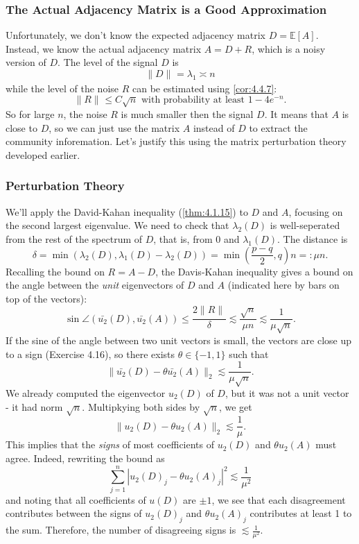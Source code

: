 \subsubsection{The Actual Adjacency Matrix is a Good Approximation}
Unfortunately, we don't know the expected adjacency matrix $D = \mathbb{E}\left[ A \right]$. Instead, we know 
the actual adjacency matrix $A = D + R$, which is a noisy version of $D$. The level of the signal $D$ is 
\[ \lVert D \rVert_{} = \lambda_1 \asymp n \]
while the level of the noise $R$ can be estimated using \cref{cor:4.4.7}:
\[ \lVert R \rVert_{} \leq C \sqrt{n} \text{ with probability at least } 1 - 4e^{-n}. \]
So for large $n$, the noise $R$ is much smaller then the signal $D$. It means that $A$ is close to $D$, so we 
can just use the matrix $A$ instead of $D$ to extract the community inforemation. Let's justify this using the 
matrix perturbation theory developed earlier.


\subsubsection{Perturbation Theory}
We'll apply the David-Kahan inequality (\cref{thm:4.1.15}) to $D$ and $A$, focusing on the second largest 
eigenvalue. We need to check that $\lambda_2(D)$ is well-seperated from the rest of the spectrum of $D$, that 
is, from 0 and $\lambda_1(D)$. The distance is 
\[ \delta = \min_{}(\lambda_2(D), \lambda_1(D) - \lambda_2(D)) = \min_{}\left( \frac{p - q}{2}, q \right)n 
=: \mu n. \]
Recalling the bound on $R = A - D$, the Davis-Kahan inequality gives a bound on the angle between the 
\textit{unit} eigenvectors of $D$ and $A$ (indicated here by bars on top of the vectors):
\[ \sin{\angle (\bar{u_2}(D), \bar{u_2}(A))} \leq \frac{2 \lVert R \rVert_{}}{\delta} 
\lesssim \frac{\sqrt{n}}{\mu n} \lesssim \frac{1}{\mu \sqrt{n}}. \]
If the sine of the angle between two unit vectors is small, the vectors are close up to a sign (Exercise 4.16), 
so there exists $\theta \in \{ -1, 1 \}$ such that 
\[ \lVert \bar{u_2}(D) - \theta \bar{u_2}(A) \rVert_{2} \lesssim \frac{1}{\mu \sqrt{n}}. \]
We already computed the eigenvector $u_2(D)$ of $D$, but it was not a unit vector - it had norm $\sqrt{n}$. 
Multipkying both sides by $\sqrt{n}$, we get 
\[ \lVert u_2(D) - \theta u_2(A) \rVert_{2} \lesssim \frac{1}{\mu}. \]
This implies that the \textit{signs} of most coefficients of $u_2(D)$ and $\theta u_2(A)$ must agree. Indeed, 
rewriting the bound as 
\[ \sum_{j = 1}^{n}|u_2(D)_j - \theta u_2(A)_j|^2 \lesssim \frac{1}{\mu^2} \]
and noting that all coefficients of $u(D)$ are $\pm 1$, we see that each disagreement contributes between the 
signs of $u_2(D)_j$ and $\theta u_2(A)_j$ contributes at least 1 to the sum. Therefore, the number of 
disagreeing signs is $\lesssim \frac{1}{\mu^2}$.


